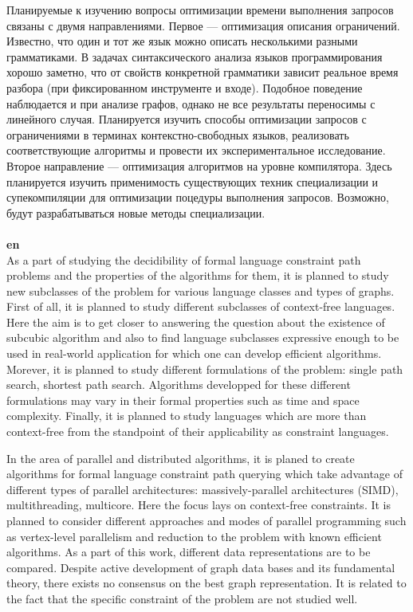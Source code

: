 \documentclass[12pt]{article}  %
\theoremstyle{remark}
\begin{document}
Планируемые к изучению вопросы оптимизации времени выполнения запросов связаны с двумя направлениями.
Первое --- оптимизация описания ограничений.
Известно, что один и тот же язык можно описать несколькими разными грамматиками.
В задачах синтаксического анализа языков программирования хорошо заметно, что от свойств конкретной грамматики зависит реальное время разбора (при фиксированном инструменте и входе).
Подобное поведение наблюдается и при анализе графов, однако не все результаты переносимы с линейного случая. Планируется изучить способы оптимизации запросов с ограничениями в терминах контекстно-свободных языков, реализовать соответствующие алгоритмы и провести их экспериментальное исследование. Второе направление --- оптимизация алгоритмов на уровне компилятора. Здесь планируется изучить применимость существующих техник специализации и супекомпиляции для оптимизации поцедуры выполнения запросов. Возможно, будут разрабатываться новые методы специализации.
\\
\\
\textbf{en}\\
As a part of studying the decidibility of formal language constraint path problems and the properties of the algorithms for them, it is planned to study new subclasses of the problem for various language classes and types of graphs.
First of all, it is planned to study different subclasses of context-free languages.
Here the aim is to get closer to answering the question about the existence of subcubic algorithm and also to find language subclasses expressive enough to be used in real-world application for which one can develop efficient algorithms.
Morever, it is planned to study different formulations of the problem: single path search, shortest path search.
Algorithms developped for these different formulations may vary in their formal properties such as time and space complexity.
Finally, it is planned to study languages which are more than context-free from the standpoint of their applicability as constraint languages.

In the area of parallel and distributed algorithms, it is planed to create algorithms for formal language constraint path querying which take advantage of different types of parallel architectures: massively-parallel architectures (SIMD), multithreading, multicore.
Here the focus lays on context-free constraints.
It is planned to consider different approaches and modes of parallel programming such as vertex-level parallelism and reduction to the problem with known efficient algorithms.
As a part of this work, different data representations are to be compared.
Despite active development of graph data bases and its fundamental theory, there exists no consensus on the best graph representation.
It is related to the fact that the specific constraint of the problem are not studied well.
\end{document}
